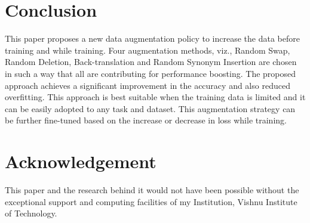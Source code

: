 \documentclass{article}
\begin{document}
\section{Conclusion}
This paper proposes a new data augmentation policy to increase the data before training and while training. Four augmentation methods, viz., Random Swap, Random Deletion, Back-translation and Random Synonym Insertion are chosen in such a way that all are contributing for performance boosting. The proposed approach achieves a significant improvement in the accuracy and also reduced overfitting. This approach is best suitable when the training data is limited and it can be easily adopted to any task and dataset. This augmentation strategy can be further fine-tuned based on the increase or decrease in loss while training.
\section{Acknowledgement}
This paper and the research behind it would not have been possible without the exceptional support and computing facilities of my Institution, Vishnu Institute of Technology.
\end{document}
